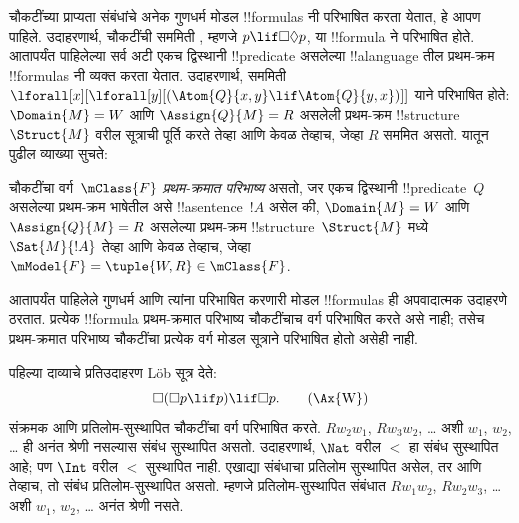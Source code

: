 \documentclass[../../../include/open-logic-section]{subfiles}
\begin{document}


चौकटींच्या प्राप्यता संबंधांचे अनेक गुणधर्म मोडल
!!{formula}s नी परिभाषित करता येतात, हे आपण पाहिले.
उदाहरणार्थ, चौकटींची सममिती , म्हणजे
$p \lif \Box\Diamond
p$, या !!{formula} ने परिभाषित होते. आतापर्यंत
पाहिलेल्या सर्व अटी एकच द्विस्थानी !!{predicate}
असलेल्या !!a{language} तील प्रथम-क्रम !!{formula}s
नी व्यक्त करता येतात. उदाहरणार्थ, सममिती
$\lforall[x][\lforall[y][(\Atom{Q}{x,y} \lif \Atom{Q}{y, x})]]$
याने परिभाषित होते: $\Domain{M} =
W$ आणि $\Assign{Q}{M} = R$ असलेली प्रथम-क्रम
!!{structure}~$\Struct{M}$ वरील सूत्राची पूर्ति करते
तेव्हा आणि केवळ तेव्हाच, जेव्हा $R$ सममित असतो.
यातून पुढील व्याख्या सुचते:

\begin{defn}
  चौकटींचा वर्ग~$\mClass{F}$ \emph{प्रथम-क्रमात
  परिभाष्य} असतो, जर एकच द्विस्थानी !!{predicate}~$Q$
  असलेल्या प्रथम-क्रम भाषेतील असे !!a{sentence}~$!A$
  असेल की, $\Domain{M} = W$ आणि $\Assign{Q}{M}
  = R$ असलेल्या प्रथम-क्रम !!{structure}~$\Struct{M}$
  मध्ये $\Sat{M}{!A}$ तेव्हा आणि केवळ तेव्हाच,
  जेव्हा $\mModel{F} =
  \tuple{W, R} \in \mClass{F}$.
\end{defn}

आतापर्यंत पाहिलेले गुणधर्म आणि त्यांना परिभाषित करणारी
मोडल !!{formula}s ही अपवादात्मक उदाहरणे ठरतात.
प्रत्येक !!{formula} प्रथम-क्रमात परिभाष्य चौकटींचाच
वर्ग परिभाषित करते असे नाही; तसेच प्रथम-क्रमात
परिभाष्य चौकटींचा प्रत्येक वर्ग मोडल सूत्राने
परिभाषित होतो असेही नाही.

पहिल्या दाव्याचे प्रतिउदाहरण L\"ob सूत्र देते:
\begin{equation}
\Box(\Box p \lif p) \lif \Box p. \tag{\Ax{W}}
\end{equation}
 संक्रमक आणि प्रतिलोम-सुस्थापित चौकटींचा वर्ग
परिभाषित करते. $Rw_2w_1$, $Rw_3w_2$, \dots{}
अशी $w_1$, $w_2$, \dots{} ही अनंत श्रेणी नसल्यास
संबंध सुस्थापित असतो. उदाहरणार्थ, $\Nat$ वरील
$<$ हा संबंध सुस्थापित आहे; पण $\Int$ वरील
$<$ सुस्थापित नाही. एखाद्या संबंधाचा प्रतिलोम
सुस्थापित असेल, तर आणि तेव्हाच, तो संबंध प्रतिलोम-सुस्थापित
असतो. म्हणजे प्रतिलोम-सुस्थापित संबंधात $Rw_1w_2$,
$Rw_2w_3$, \dots{} अशी $w_1$, $w_2$, \dots{}
अनंत श्रेणी नसते.
\end{document}
